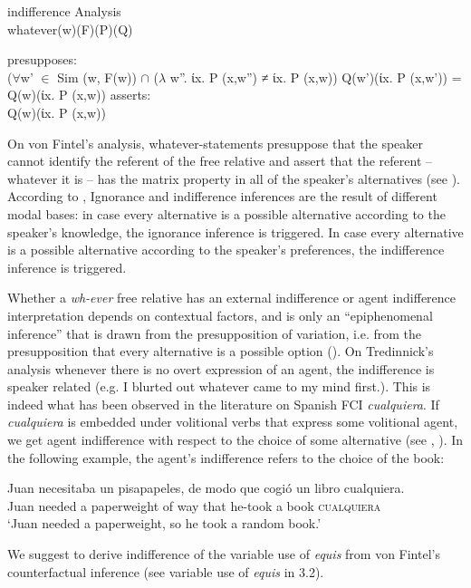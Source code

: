 \documentclass[output=paper]{langsci/langscibook}
\begin{document}
\ea indifference Analysis \citep{Fintel2000}\\
whatever(w)(F)(P)(Q)
\begin{xlist}
\ex presupposes:\\
{($\forall$w’ $\in$ Sim (w, F(w)) $\cap$ ($\lambda$ w”. ίx. P (x,w”) ≠ ίx. P (x,w))
	Q(w’)(ίx. P (x,w’)) = Q(w)(ίx. P (x,w))}
\ex	asserts:\\
{Q(w)(ίx. P (x,w))}
\end{xlist}
\z

On von Fintel’s analysis, whatever-statements presuppose that the speaker cannot identify the referent of the free relative and assert that the referent -- whatever it is -- has the matrix property in all of the speaker's alternatives (see \citealt{Condoravdi2005}). According to \cite{Fintel2000}, Ignorance and indifference inferences are the result of different modal bases: in case every alternative is a possible alternative according to the speaker’s knowledge, the ignorance inference is triggered. In case every alternative is a possible alternative according to the speaker's preferences, the indifference inference is triggered.

Whether a \textit{wh-ever} free relative has an external indifference or agent indifference interpretation depends on contextual factors, and is only an “epiphenomenal inference” that is drawn from the presupposition of variation, i.e. from the presupposition that every alternative is a possible option (\citealt[108]{Tredinnick2005}). On Tredinnick’s analysis whenever there is no overt expression of an agent, the indifference is speaker related (e.g. I blurted out whatever came to my mind first.). This is indeed what has been observed in the literature on Spanish FCI \textit{cualquiera}. If \textit{cualquiera} is embedded under volitional verbs that express some volitional agent, we get agent indifference with respect to the choice of some alternative (see \citealt{CR2008}, \citealt{AM2011}). In the following example, the agent’s indifference refers to the choice of the book:

\ea
\gll Juan necesitaba un pisapapeles, de modo que cogió un libro cualquiera.\\
Juan needed a paperweight of way that he-took a book \textsc{cualquiera}\\
\glt ‘Juan needed a paperweight, so he took a random book.’
\z

We suggest to derive indifference of the variable use of \textit{equis} from von Fintel's counterfactual inference (see variable use of \textit{equis} in 3.2).
\end{document}
